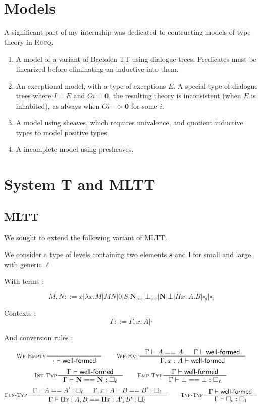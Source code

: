 \documentclass{article}
\DeclareMathOperator{\rec}{rec}
\newcommand{\0}{\mathbf{0}}
\newcommand{\1}{\mathbf{1}}
\newcommand{\nat}{\mathbf{N}}
\newcommand{\tctx}{\Gamma}
\newcommand{\Wf}{\textsf{well-formed}}
\newcommand{\slvl}{\mathbf{s}}
\newcommand{\llvl}{\mathbf{l}}
\begin{document}
\section{Models}

A significant part of my internship was dedicated to contructing models of type theory in \textsc{Rocq}.

\begin{enumerate}
    \item A model of a variant of Baclofen TT using dialogue trees. Predicates must be linearized before eliminating an inductive into them.
    \item An exceptional model, with a type of exceptions $E$. A special type of dialogue trees where $I = E$ and $O i = \mathbf{0}$, the resulting theory is inconsistent (when $E$ is inhabited), as always when $O i -> \mathbf{0}$ for some $i$.
    \item A model using sheaves, which requires univalence, and quotient inductive types to model positive types.
    \item A incomplete model using presheaves.
\end{enumerate}


\section{System T and MLTT}
\subsection{MLTT}
We sought to extend the following variant of MLTT.

We consider a type of levels containing two elements $\slvl$ and $\llvl$ for small and large, with generic $\ell$

With terms :

$$ M,N ::= x | \lambda x. M | MN | 0 | S | \nat_{\rec} | \bot_{\rec} | \nat | \bot | \Pi x :A.B | \square_\slvl | \square_\llvl$$


Contexts :
$$ \tctx ::= \tctx, x : A | \cdot $$

And conversion rules :

$$
    \inference[\textsc{Wf-Empty}]{}{\cdot |- \Wf} \qquad
    \inference[\textsc{Wf-Ext}]{\tctx |- A == A & \tctx |- \Wf}{ \tctx, x : A |- \Wf}
$$
$$
    \inference[\textsc{Int-Typ}]{\tctx |- \Wf}{\tctx |- \nat == \nat : \square_\ell} \qquad
    \inference[\textsc{Emp-Typ}]{\tctx |- \Wf}{\tctx |- \bot == \bot : \square_\ell}
$$
$$
    \inference[\textsc{Fun-Typ}]{\tctx |- A == A' : \square_\ell & \tctx, x : A |- B == B' : \square_\ell}{\tctx |- \Pi x  : A, B == \Pi x: A', B' : \square_\ell} \qquad
    \inference[\textsc{Typ-Typ}]{\tctx |- \Wf}{\tctx |- \square_\slvl : \square_\llvl}
$$
\end{document}
